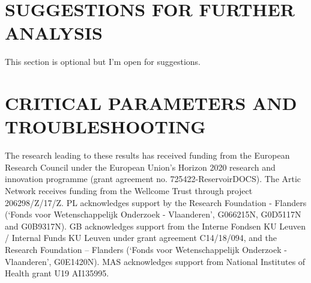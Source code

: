 \documentclass{article}
\begin{document}
\begin{multicols}{2}
\section*{SUGGESTIONS FOR FURTHER ANALYSIS}

This section is optional but I'm open for suggestions. %



\section*{CRITICAL PARAMETERS AND TROUBLESHOOTING}

The research leading to these results has received funding from the European Research Council under the European Union's Horizon 2020 research and innovation programme (grant agreement no. 725422-ReservoirDOCS).
The Artic Network receives funding from the Wellcome Trust through project 206298/Z/17/Z.
PL acknowledges support by the Research Foundation - Flanders (‘Fonds voor Wetenschappelijk Onderzoek - Vlaanderen’, G066215N, G0D5117N and G0B9317N).
GB acknowledges support from the Interne Fondsen KU Leuven / Internal Funds KU Leuven under grant agreement C14/18/094, and the Research Foundation -- Flanders (‘Fonds voor Wetenschappelijk Onderzoek - Vlaanderen’, G0E1420N).
MAS acknowledges support from National Institutes of Health grant U19 AI135995.






\end{multicols}
\end{document}
